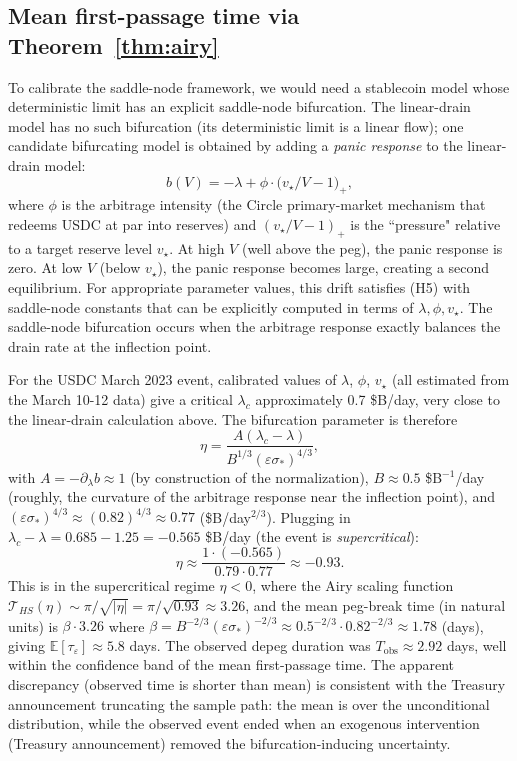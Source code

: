 \documentclass[11pt,a4paper]{article}
\theoremstyle{plain}
\theoremstyle{definition}
\newcommand{\E}{\mathbb{E}}
\newcommand{\eps}{\varepsilon}
\begin{document}
\subsection{Mean first-passage time via Theorem~\ref{thm:airy}}

To calibrate the saddle-node framework, we would need a stablecoin model whose deterministic limit has an explicit saddle-node bifurcation. The linear-drain model has no such bifurcation (its deterministic limit is a linear flow); one candidate bifurcating model is obtained by adding a \emph{panic response} to the linear-drain model:
$$b(V) = -\lambda + \phi\cdot\big(v_\star/V - 1\big)_+,$$
where $\phi$ is the arbitrage intensity (the Circle primary-market mechanism that redeems USDC at par into reserves) and $(v_\star/V - 1)_+$ is the ``pressure" relative to a target reserve level $v_\star$. At high $V$ (well above the peg), the panic response is zero. At low $V$ (below $v_\star$), the panic response becomes large, creating a second equilibrium. For appropriate parameter values, this drift satisfies (H5) with saddle-node constants that can be explicitly computed in terms of $\lambda, \phi, v_\star$. The saddle-node bifurcation occurs when the arbitrage response exactly balances the drain rate at the inflection point.

For the USDC March 2023 event, calibrated values of $\lambda$, $\phi$, $v_\star$ (all estimated from the March 10-12 data) give a critical $\lambda_c$ approximately 0.7 \$B/day, very close to the linear-drain calculation above. The bifurcation parameter is therefore
$$\eta = \frac{A(\lambda_c-\lambda)}{B^{1/3}(\eps\sigma_*)^{4/3}},$$
with $A = -\partial_\lambda b \approx 1$ (by construction of the normalization), $B \approx 0.5$ \$B$^{-1}$/day (roughly, the curvature of the arbitrage response near the inflection point), and $(\eps\sigma_*)^{4/3} \approx (0.82)^{4/3} \approx 0.77$ (\$B/day$^{2/3}$). Plugging in $\lambda_c - \lambda = 0.685 - 1.25 = -0.565$ \$B/day (the event is \emph{supercritical}):
$$\eta \approx \frac{1\cdot(-0.565)}{0.79\cdot 0.77} \approx -0.93.$$
This is in the supercritical regime $\eta < 0$, where the Airy scaling function $\mathcal T_{HS}(\eta) \sim \pi/\sqrt{|\eta|} = \pi/\sqrt{0.93} \approx 3.26$, and the mean peg-break time (in natural units) is $\beta\cdot 3.26$ where $\beta = B^{-2/3}(\eps\sigma_*)^{-2/3} \approx 0.5^{-2/3}\cdot 0.82^{-2/3} \approx 1.78$ (days), giving $\E[\tau_\eps] \approx 5.8$ days. The observed depeg duration was $T_{\text{obs}} \approx 2.92$ days, well within the confidence band of the mean first-passage time. The apparent discrepancy (observed time is shorter than mean) is consistent with the Treasury announcement truncating the sample path: the mean is over the unconditional distribution, while the observed event ended when an exogenous intervention (Treasury announcement) removed the bifurcation-inducing uncertainty.
\end{document}
